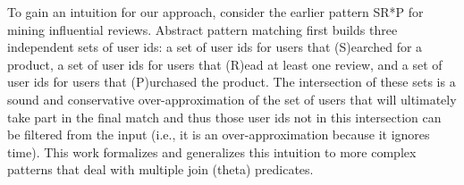 


To gain an intuition for our approach, consider the earlier pattern SR*P for
mining influential reviews.  Abstract pattern matching first builds three
independent sets of user ids: a set of user ids for users that (S)earched for a
product, a set of user ids for users that (R)ead at least one review, and a set
of user ids for users that (P)urchased the product.  The intersection of these
sets is a sound and conservative over-approximation of the set of users that
will ultimately take part in the final match and thus those user ids not in this
intersection can be filtered from the input (i.e., it is an over-approximation
because it ignores time).  %
This work formalizes and generalizes this intuition to more complex patterns
that deal with multiple join (theta) predicates.

